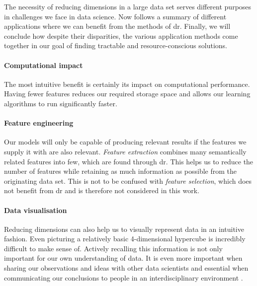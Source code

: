 The necessity of reducing dimensions in a large data set serves different purposes in challenges we face in data science. 
Now follows a summary of different applications where we can benefit from the methods of \acrlong{dr}.
Finally, we will conclude how despite their disparities, the various application methods come together in our goal of finding tractable and resource-conscious solutions.

\paragraph{Computational impact}

The most intuitive benefit is certainly its impact on computational performance.
Having fewer features reduces our required storage space and allows our learning algorithms to run significantly faster. \cite{PythonMachineLearningCh1}
\vspace{-5mm}

\paragraph{Feature engineering}

Our models will only be capable of producing relevant results if the features we supply it with are also relevant. \cite{HandsOnMLCh1}
\emph{Feature extraction} combines many semantically related features into few, which are found through \gls{dr}.
This helps us to reduce the number of features while retaining as much information as possible from the originating data set.
This is not to be confused with \emph{feature selection}, which does not benefit from \gls{dr} and is therefore not considered in this work.
\vspace{-5mm}

\paragraph{Data visualisation}

Reducing dimensions can also help us to visually represent data in an intuitive fashion.
Even picturing a relatively basic 4-dimensional \gls{hypercube} is incredibly difficult to make sense of.
Actively recalling this information is not only important for our own understanding of data. It is even more important when sharing our observations and ideas with other data scientists and essential when communicating our conclusions to people in an interdisciplinary environment \cite{PythonMachineLearningCh5}.
\vspace{-5mm}

